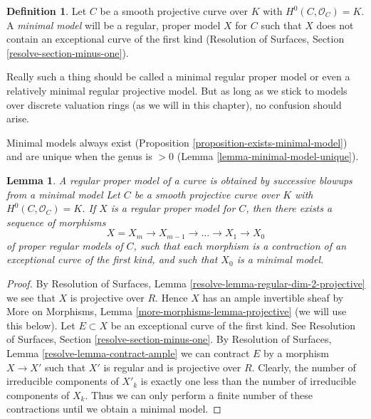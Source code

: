 \documentclass{stacks-project}
\newenvironment{slogan}{\comment}{\endcomment}
\theoremstyle{plain}
\newtheorem{lemma}[subsection]{Lemma}
\theoremstyle{definition}
\newtheorem{definition}[subsection]{Definition}
\theoremstyle{remark}
\numberwithin{equation}{subsection}
\begin{document}
\begin{definition}
\label{definition-minimal-model}
Let $C$ be a smooth projective curve over $K$ with
$H^0(C, \mathcal{O}_C) = K$. A {\it minimal model}
will be a regular, proper model $X$ for $C$ such that
$X$ does not contain an exceptional curve of the first kind
(Resolution of Surfaces, Section \ref{resolve-section-minus-one}).
\end{definition}

\noindent
Really such a thing should be called a minimal regular proper model
or even a relatively minimal regular projective model. But as long
as we stick to models over discrete valuation rings (as we will
in this chapter), no confusion should arise.

\medskip\noindent
Minimal models always exist
(Proposition \ref{proposition-exists-minimal-model}) and are unique
when the genus is $> 0$ (Lemma \ref{lemma-minimal-model-unique}).

\begin{lemma}
\label{lemma-pre-exists-minimal-model}
\begin{slogan}
A regular proper model of a curve is obtained by successive blowups
from a minimal model
\end{slogan}
Let $C$ be a smooth projective curve over $K$ with
$H^0(C, \mathcal{O}_C) = K$. If $X$ is a regular proper
model for $C$, then there exists a sequence of morphisms
$$
X = X_m \to X_{m - 1} \to \ldots \to X_1 \to X_0
$$
of proper regular models of $C$, such that each morphism is a
contraction of an exceptional curve of the first kind, and such
that $X_0$ is a minimal model.
\end{lemma}

\begin{proof}
By Resolution of Surfaces, Lemma \ref{resolve-lemma-regular-dim-2-projective}
we see that $X$ is projective over $R$. Hence $X$ has an ample
invertible sheaf by
More on Morphisms, Lemma \ref{more-morphisms-lemma-projective}
(we will use this below).
Let $E \subset X$ be an exceptional curve of the first kind.
See Resolution of Surfaces, Section \ref{resolve-section-minus-one}.
By Resolution of Surfaces, Lemma \ref{resolve-lemma-contract-ample}
we can contract $E$ by a morphism $X \to X'$ such that $X'$ is
regular and is projective over $R$. Clearly, the number of
irreducible components of $X'_k$ is exactly one less than the
number of irreducible components of $X_k$. Thus we can only
perform a finite number of these contractions until we
obtain a minimal model.
\end{proof}
\end{document}

